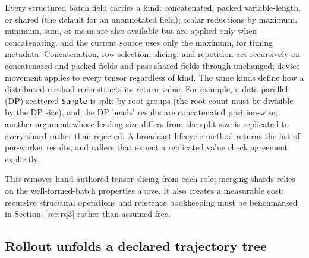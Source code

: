 \documentclass[10pt]{article}
\newcommand{\sample}{\texttt{Sample}}
\begin{document}
Every structured batch field carries a kind: concatenated, packed variable-length, or shared (the default for an unannotated field); scalar reductions by maximum, minimum, sum, or mean are also available but are applied only when concatenating, and the current source uses only the maximum, for timing metadata.
Concatenation, row selection, slicing, and repetition act recursively on concatenated and packed fields and pass shared fields through unchanged; device movement applies to every tensor regardless of kind.
The same kinds define how a distributed method reconstructs its return value.
For example, a data-parallel (DP) scattered \sample{} is split by root groups (the root count must be divisible by the DP size), and the DP heads' results are concatenated position-wise; another argument whose leading size differs from the split size is replicated to every shard rather than rejected.
A broadcast lifecycle method returns the list of per-worker results, and callers that expect a replicated value check agreement explicitly.

This removes hand-authored tensor slicing from each role; merging shards relies on the well-formed-batch properties above.
It also creates a measurable cost: recursive structural operations and reference bookkeeping must be benchmarked in Section~\ref{sec:rq3} rather than assumed free.

\subsection{Rollout unfolds a declared trajectory tree}
\label{sec:unfold}
\end{document}
